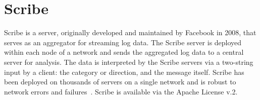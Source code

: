 \section{Scribe}

Scribe is a server, originally developed and maintained by Facebook in 2008,
that serves as an aggregator for streaming log data. The Scribe server is
deployed within each node of a network and sends the aggregated log data to a
central server for analysis. The data is interpreted by the Scribe servers via a
two-string input by a client: the category or direction, and the message
itself. Scribe has been deployed on thousands of servers on a single network and
is robust to network errors and failures~\cite{FBScribe}. Scribe is available
via the Apache License v.2.
